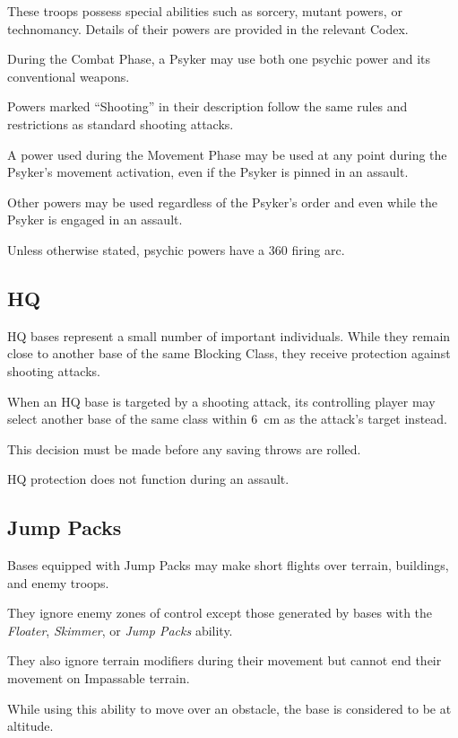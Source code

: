 These troops possess special abilities such as sorcery, mutant powers, or technomancy. Details of their powers are provided in the relevant Codex.

During the Combat Phase, a Psyker may use both one psychic power and its conventional weapons.

Powers marked ``Shooting'' in their description follow the same rules and restrictions as standard shooting attacks.

A power used during the Movement Phase may be used at any point during the Psyker's movement activation, even if the Psyker is pinned in an assault.

Other powers may be used regardless of the Psyker's order and even while the Psyker is engaged in an assault.

Unless otherwise stated, psychic powers have a 360\textdegree{} firing arc.

\subsection{HQ}

HQ bases represent a small number of important individuals. While they remain close to another base of the same Blocking Class, they receive protection against shooting attacks.

When an HQ base is targeted by a shooting attack, its controlling player may select another base of the same class within 6~cm as the attack's target instead.

This decision must be made before any saving throws are rolled.

HQ protection does not function during an assault.

\subsection{Jump Packs}

Bases equipped with Jump Packs may make short flights over terrain, buildings, and enemy troops.

They ignore enemy zones of control except those generated by bases with the \textit{Floater}, \textit{Skimmer}, or \textit{Jump Packs} ability.

They also ignore terrain modifiers during their movement but cannot end their movement on Impassable terrain.

While using this ability to move over an obstacle, the base is considered to be at altitude.

